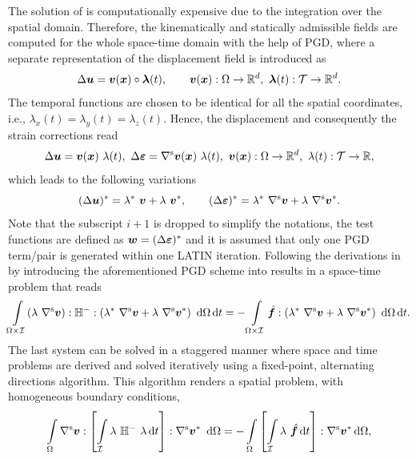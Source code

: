 The solution of  is computationally expensive due to the integration over the spatial domain. Therefore, the kinematically and statically admissible fields are computed for the whole space-time domain with the help of PGD, where a separate representation of the displacement field is introduced as
\begin{equation}
	\Delta \mbox{$\bm  u$} = {\mbox{$\bm  v$}}(\mbox{$\bm  x$}) \circ \mbox{$\bm \lambda$}(t), {\qquad {\mbox{$\bm  v$}}(\mbox{$\bm  x$}):\Omega \rightarrow {\mathbb{ R}}^{d},\  \mbox{$\bm \lambda$}(t):{\cal T} \rightarrow {\mathbb{ R}}^{d}.}
\end{equation}
The temporal functions are chosen to be identical for all the spatial coordinates, i.e., $\lambda_{x}(t)=\lambda_{y}(t)=\lambda_{z}(t)$. Hence, the displacement and consequently the strain corrections read
\begin{equation}
	\Delta \mbox{$\bm  u$} = {\mbox{$\bm  v$}}(\mbox{$\bm  x$}) \  \lambda(t) ,\ \Delta \mbox{$\bm \varepsilon $} = {\rm \nabla^s} \mbox{$\bm  v$}(\mbox{$\bm  x$}) \  \lambda(t) , { \ {\mbox{$\bm  v$}}(\mbox{$\bm  x$}):\Omega \rightarrow {\mathbb{ R}}^{d},\  \lambda(t):{\cal T} \rightarrow {\mathbb{ R}},}
\end{equation}
which leads to the following variations
\begin{equation}
	(\Delta \mbox{$\bm  u$})^\ast = \lambda^\ast \  \mbox{$\bm  v$} + \lambda \  \mbox{$\bm  v$}^\ast, \qquad  (\Delta \mbox{$\bm \varepsilon $})^\ast = \lambda^\ast \  {\rm \nabla^s} \mbox{$\bm  v$} + \lambda \  {\rm \nabla^s} \mbox{$\bm  v$}^\ast.
\end{equation}
Note that the subscript $i+1$ is dropped to simplify the notations, the test functions are defined as $\mbox{$\bm  w$} = (\Delta \mbox{$\bm \varepsilon $})^\ast$ and it is assumed that only one PGD term/pair is generated within one LATIN iteration. Following the derivations in \parencite{allix1989damage,bha2017} by introducing the aforementioned PGD scheme into  results in a space-time problem that reads
\begin{equation}
	\int \displaylimits_{\Omega \times {\cal I}}  (\lambda \  {\rm \nabla^s} \mbox{$\bm  v$}) : {\mathbb{ H}}^- : (\lambda^\ast\ {\rm \nabla^s} \mbox{$\bm  v$} + \lambda\ {\rm \nabla^s} \mbox{$\bm  v$}^\ast)\ {\,\rm d} \Omega {\,\rm d} t
	= - \int \displaylimits_{\Omega \times {\cal I}} \mbox{\ensuremath{\hat{\bm f}}} : (\lambda^\ast\ {\rm \nabla^s} \mbox{$\bm  v$} + \lambda\ {\rm \nabla^s} \mbox{$\bm  v$}^\ast)\ {\,\rm d} \Omega {\,\rm d} t .
	\label{eq:space_time_problem}
\end{equation}
The last system can be solved in a staggered manner where space and time problems are derived and solved iteratively \parencite{chinesta2014separated} using a fixed-point, alternating directions algorithm. This algorithm renders a spatial problem, with homogeneous boundary conditions,
\begin{equation}
	\intS \grads{\fv} \dcontraction \left[ \intT \lambda \ \ffH^- \ \lambda \d t \right] \dcontraction \grads{\fv}^\ast \ \d \Omega = - \intS \left[ \intT \lambda \ \fhf \d t \right] \dcontraction \grads{\fv}^\ast \d \Omega,
\end{equation}
